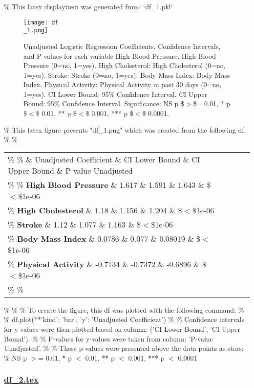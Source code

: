 \documentclass[11pt]{article}
\begin{document}
\begin{codeoutput}
\% This latex displayitem was generated from: `df\_1.pkl`

\begin{figure}[htbp]
\centering
\texttt{[image: df\\\_1.png]}
\caption{Unadjusted Logistic Regression Coefficients, Confidence Intervals, and P-values for each variable
High Blood Pressure: High Blood Pressure (0=no, 1=yes). 
High Cholesterol: High Cholesterol (0=no, 1=yes). 
Stroke: Stroke (0=no, 1=yes). 
Body Mass Index: Body Mass Index. 
Physical Activity: Physical Activity in past 30 days (0=no, 1=yes). 
CI Lower Bound: 95\% Confidence Interval. 
CI Upper Bound: 95\% Confidence Interval. 
Significance: NS p \$$>$\$= 0.01, * p \$$<$\$ 0.01, ** p \$$<$\$ 0.001, *** p \$$<$\$ 0.0001. }
\label{figure:Unadjusted\_Coefficients}
\end{figure}
\% This latex figure presents "df\_1.png" which was created from the following df:
\% 
\% \begin{tabular}{lrrrl}
\% \toprule
\%  \& Unadjusted Coefficient \& CI Lower Bound \& CI Upper Bound \& P-value Unadjusted \\
\% \midrule
\% \textbf{High Blood Pressure} \& 1.617 \& 1.591 \& 1.643 \& \$$<$\$1e-06 \\
\% \textbf{High Cholesterol} \& 1.18 \& 1.156 \& 1.204 \& \$$<$\$1e-06 \\
\% \textbf{Stroke} \& 1.12 \& 1.077 \& 1.163 \& \$$<$\$1e-06 \\
\% \textbf{Body Mass Index} \& 0.0786 \& 0.077 \& 0.08019 \& \$$<$\$1e-06 \\
\% \textbf{Physical Activity} \& -0.7134 \& -0.7372 \& -0.6896 \& \$$<$\$1e-06 \\
\% \bottomrule
\% \end{tabular}
\% 
\% 
\% To create the figure, this df was plotted with the following command:
\% 
\% df.plot(**{'kind': 'bar', 'y': 'Unadjusted Coefficient'})
\% 
\% Confidence intervals for y-values were then plotted based on column: ('CI Lower Bound', 'CI Upper Bound').
\% 
\% P-values for y-values were taken from column: 'P-value Unadjusted'.
\% 
\% These p-values were presented above the data points as stars:
\% NS p $>$= 0.01, * p $<$ 0.01, ** p $<$ 0.001, *** p $<$ 0.0001
\end{codeoutput}\hypertarget{file-df-2-tex}{}

\subsubsection*{\hyperlink{code-LaTeX Table Design-df-2-tex}{df\_2.tex}}
\end{document}
